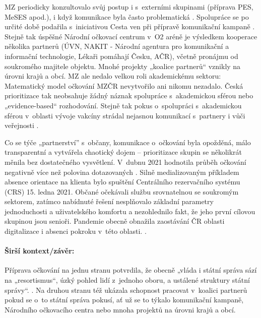 MZ periodicky konzultovalo svůj postup i s~externími skupinami (příprava PES, MeSES apod.), i když komunikace byla často problematická \cite{irozhlas_smejkalovu_2021, jerabkova_smejkal_2021}. Spolupráce se po určité době podařila s~iniciativou Cesta ven při přípravě komunikační kampaně \cite{mudrochova_kampan_2020}. Stejně tak úspěšné Národní očkovací centrum v~O2 aréně je výsledkem kooperace několika partnerů (ÚVN, NAKIT - Národní agentura pro komunikační a informační technologie, Lékaři pomáhají Česku, AČR), včetně pronájmu od soukromého majitele objektu. Mnohé projekty „koalice partnerů“ vznikly na úrovni krajů a obcí. MZ ale nedalo velkou roli akademickému sektoru: Matematický model očkování MZČR nevytvořilo ani nikomu nezadalo. Česká prioritizace \cite{strategie_ockovani_mzcr_2020} tak neobsahuje žádný náznak spolupráce s~akademickou sférou nebo „evidence-based“ rozhodování. Stejně tak pokus o~spolupráci s~akademickou sférou v~oblasti vývoje vakcíny strádal nejasnou komunikací s~partnery i vůči veřejnosti \cite{bezdekova_ceska_2021}.

Co se týče „partnerství” s~občany, komunikace o~očkování byla opožděná, málo transparentní a vytvářela chaotický dojem -- prioritizace skupin se několikrát měnila bez dostatečného vysvětlení. V~dubnu 2021 hodnotila průběh očkování negativně více než polovina dotazovaných \cite{cvvm_verejnost_ockovani_2021}. Silně medializovaným příkladem absence orientace na klienta bylo spuštění Centrálního rezervačního systému (CRS) 15. ledna 2021. Občané očekávali službu srovnatelnou se soukromým sektorem, zatímco nabídnuté řešení nesplňovalo základní parametry jednoduchosti a uživatelského komfortu \cite{blaha_registrace_2021} a nezohlednilo fakt, že jeho první cílovou skupinou jsou senioři. Pandemie obecně obnažila zaostávání ČR oblasti digitalizace \cite{usela_pres_2021} i absenci pokroku v~této oblasti. \cite{european_comission_desi_2020, hlidac_nedigitalni_2021}.

\paragraph{Širší kontext/závěr:} Příprava očkování na jednu stranu potvrdila, že obecně „vláda i státní správa sází na „resortismus“, úzký pohled lidí z~jednoho oboru, a ustálené struktury státní správy“. \cite{hudema_hudema_2021}. Na druhou stranu též ukázala schopnost pracovat v~koalici partnerů pokud se o~to státní správa pokusí, ať už se to týkalo komunikační kampaně, Národního očkovacího centra nebo mnoha projektů na úrovni krajů a obcí.

